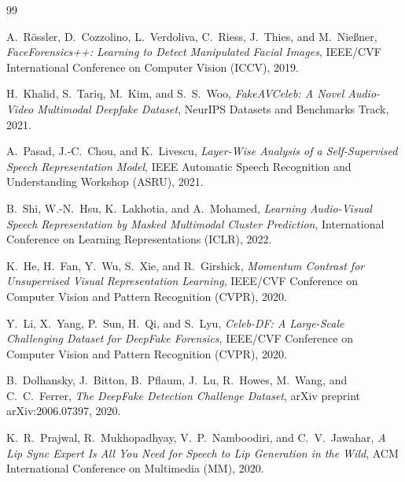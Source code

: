 \documentclass[12pt, letterpaper]{article}
\begin{document}
\newpage

\begin{thebibliography}{99}

A.~R{\"o}ssler, D.~Cozzolino, L.~Verdoliva, C.~Riess, J.~Thies, and M.~Nie{\ss}ner,
\textit{FaceForensics++: Learning to Detect Manipulated Facial Images},
IEEE/CVF International Conference on Computer Vision (ICCV), 2019.

H.~Khalid, S.~Tariq, M.~Kim, and S.~S.~Woo,
\textit{FakeAVCeleb: A Novel Audio-Video Multimodal Deepfake Dataset},
NeurIPS Datasets and Benchmarks Track, 2021.

A.~Pasad, J.-C.~Chou, and K.~Livescu,
\textit{Layer-Wise Analysis of a Self-Supervised Speech Representation Model},
IEEE Automatic Speech Recognition and Understanding Workshop (ASRU), 2021.

B.~Shi, W.-N.~Hsu, K.~Lakhotia, and A.~Mohamed,
\textit{Learning Audio-Visual Speech Representation by Masked Multimodal Cluster Prediction},
International Conference on Learning Representations (ICLR), 2022.

K.~He, H.~Fan, Y.~Wu, S.~Xie, and R.~Girshick,
\textit{Momentum Contrast for Unsupervised Visual Representation Learning},
IEEE/CVF Conference on Computer Vision and Pattern Recognition (CVPR), 2020.

Y.~Li, X.~Yang, P.~Sun, H.~Qi, and S.~Lyu,
\textit{Celeb-DF: A Large-Scale Challenging Dataset for DeepFake Forensics},
IEEE/CVF Conference on Computer Vision and Pattern Recognition (CVPR), 2020.

B.~Dolhansky, J.~Bitton, B.~Pflaum, J.~Lu, R.~Howes, M.~Wang, and C.~C.~Ferrer,
\textit{The DeepFake Detection Challenge Dataset},
arXiv preprint arXiv:2006.07397, 2020.

K.~R.~Prajwal, R.~Mukhopadhyay, V.~P.~Namboodiri, and C.~V.~Jawahar,
\textit{A Lip Sync Expert Is All You Need for Speech to Lip Generation in the Wild},
ACM International Conference on Multimedia (MM), 2020.

\end{thebibliography}
\end{document}
